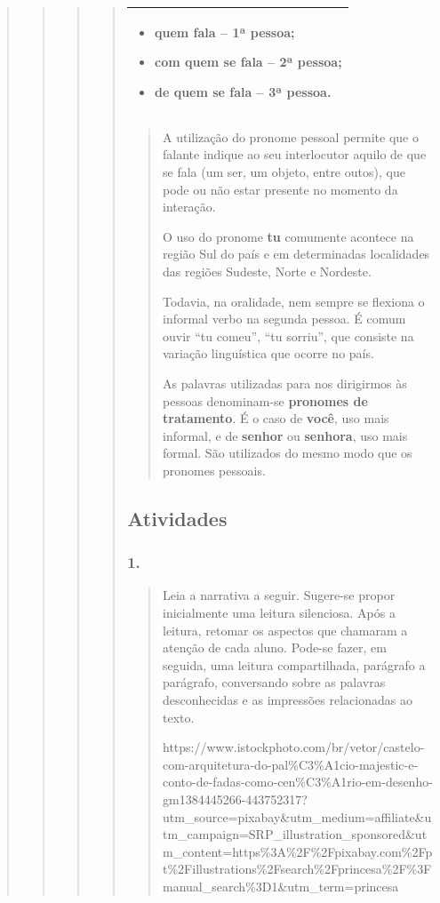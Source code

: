 \begin{quote}
\begin{quote}
\begin{quote}
\begin{quote}
\begin{longtable}[]{@{}l@{}}
\begin{minipage}[t]{0.97\columnwidth}
\begin{itemize}
\item
  quem fala -- 1ª pessoa;
\item
  com quem se fala -- 2ª pessoa;
\item
  de quem se fala -- 3ª pessoa.
\end{itemize}\strut
\end{minipage}\tabularnewline
\bottomrule
\end{longtable}

\begin{quote}
A utilização do pronome pessoal permite que o falante indique ao seu
interlocutor aquilo de que se fala (um ser, um objeto, entre outos), que
pode ou não estar presente no momento da interação.

O uso do pronome \textbf{tu} comumente acontece na região Sul do país e
em determinadas localidades das regiões Sudeste, Norte e Nordeste.

Todavia, na oralidade, nem sempre se flexiona o informal verbo na
segunda pessoa. É comum ouvir ``tu comeu'', ``tu sorriu'', que consiste
na variação linguística que ocorre no país.

As palavras utilizadas para nos dirigirmos às pessoas denominam-se
\textbf{pronomes de tratamento}. É o caso de \textbf{você}, uso mais
informal, e de \textbf{senhor} ou \textbf{senhora}, uso mais formal. São
utilizados do mesmo modo que os pronomes pessoais.
\end{quote}

\subsection{Atividades}\label{atividades-9}

\subsubsection{1. }\label{section-71}

\begin{quote}
Leia a narrativa a seguir. Sugere-se propor inicialmente uma leitura
silenciosa. Após a leitura, retomar os aspectos que chamaram a atenção
de cada aluno. Pode-se fazer, em seguida, uma leitura compartilhada,
parágrafo a parágrafo, conversando sobre as palavras desconhecidas e as
impressões relacionadas ao texto.

https://www.istockphoto.com/br/vetor/castelo-com-arquitetura-do-pal\%C3\%A1cio-majestic-e-conto-de-fadas-como-cen\%C3\%A1rio-em-desenho-gm1384445266-443752317?utm\_source=pixabay\&utm\_medium=affiliate\&utm\_campaign=SRP\_illustration\_sponsored\&utm\_content=https\%3A\%2F\%2Fpixabay.com\%2Fpt\%2Fillustrations\%2Fsearch\%2Fprincesa\%2F\%3Fmanual\_search\%3D1\&utm\_term=princesa


\end{quote}
\end{quote}
\end{quote}
\end{quote}
\end{quote}
